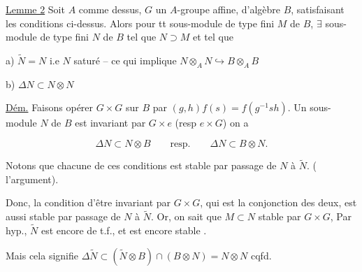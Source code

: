 
\uline{Lemme 2} Soit  $A$ comme dessus, $G$ un $A$-groupe affine, d'algèbre $B$, satisfaisant les conditions ci-dessus. Alors pour tt sous-module de type fini $M$ de $B$, $\exists$ sous-module de type fini $N$ de $B$ tel que $N\supset M$ et tel que

a) $\widetilde N=N$ i.e $N$ saturé -- ce qui implique $N\otimes_A N\hookrightarrow B\otimes_A B$

b) $\Delta N\subset N\otimes N$

\uline{Dém.} Faisons opérer $G\times G$  sur $B$ par $(g,h)f(s)=f(g^{-1}sh)$.  Un sous-module $N$ de $B$ est invariant par $G\times e$ (resp $e\times G$\deleted{\unsure{)}})   on a

\[
\Delta N\subset N\otimes B\qquad\text{resp.}\qquad \Delta N\subset B\otimes N.
\]

Notons que  chacune de ces conditions est stable par passage de $N$ à $\widetilde N$. ( l'argument).

Donc, la condition d'être invariant par $G\times G$, qui est la conjonction des deux, est aussi stable par passage de $N$ à $\widetilde N$. Or, on sait que $M\subset N$  stable par $G\times G$, Par hyp., $\widetilde N$ est encore de t.f.,  et est encore stable .

Mais cela signifie $\Delta\widetilde N\subset(\widetilde N\otimes B)\cap(B\otimes N)=N\otimes N$ cqfd.
